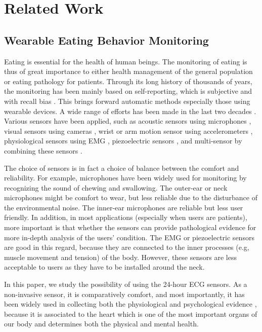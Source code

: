 \section{Related Work}
\subsection{Wearable Eating Behavior Monitoring}
	Eating is essential for the health of human beings. The monitoring of eating is thus of great importance to either health management of the general population or eating pathology for patients. Through its long history of thousands of years, the monitoring has been mainly based on self-reporting, which is subjective and with recall bias \cite{basiotis1987number}. This brings forward automatic methods especially those using wearable devices. 
	A wide range of efforts has been made in the last two decades \cite{amft2010wearable,dong2012new,farooq2014novel,farooq2015comparative,liu2012intelligent,passler2012food,sazonov2008non,sun2014ebutton,vu2017wearable}. Various sensors have been applied, such as acoustic sensors using microphones \cite{amft2010wearable}, visual sensors using cameras \cite{sun2014ebutton}, wrist or arm motion sensor using accelerometers \cite{dong2012new}, physiological sensors using EMG \cite{farooq2014novel}, piezoelectric sensors \cite{farooq2015comparative}, and multi-sensor by combining these sensors \cite{liu2012intelligent}.
	
	The choice of sensors is in fact a choice of balance between the comfort and reliability. For example, microphones have been widely used for monitoring by recognizing the sound of chewing and swallowing. The outer-ear \cite{passler2012food} or neck \cite{sazonov2008non} microphones might be comfort to wear, but less reliable due to the disturbance of the environmental noise. The inner-ear microphones are reliable but less user friendly.
	In addition, in most applications (especially when users are patients), more important is that whether the sensors can provide pathological evidence for more in-depth analysis of the users' condition. The EMG or piezoelectric sensors are good in this regard, because they are connected to the inner processes (e.g, muscle movement and tension) of the body. However, these sensors are less acceptable to users as they have to be installed around the neck.
	
	In this paper, we study the possibility of using the 24-hour ECG sensors. As a non-invasive sensor, it is comparatively comfort, and most importantly, it has been widely used in collecting both the
	physiological and psychological evidence \cite{serhani2020ecg}, because it is associated to the heart which is one of the most important organs of our body and determines both the physical and mental health.
	
